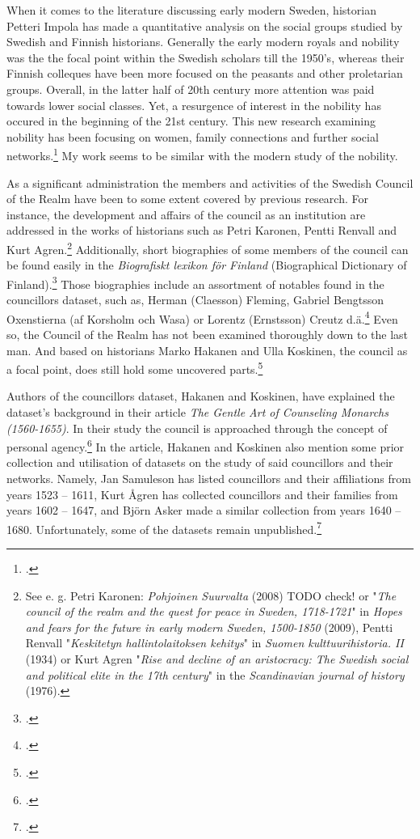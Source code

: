 When it comes to the literature discussing early modern Sweden, historian Petteri Impola has made a quantitative analysis on the social groups studied by Swedish and Finnish historians. Generally the early modern royals and nobility was the the focal point within the Swedish scholars till the 1950's, whereas their Finnish colleques have been more focused on the peasants and other proletarian groups. Overall, in the latter half of 20th century more attention was paid towards lower social classes. Yet, a resurgence of interest in the nobility has occured in the beginning of the 21st century. This new research examining nobility has been focusing on women, family connections and further social networks.\footcite{impola2024} My work seems to be similar with the modern study of the nobility.

As a significant administration the members and activities of the Swedish Council of the Realm have been to some extent covered by previous research. For instance, the development and affairs of the council as an institution are addressed in the works of historians such as Petri Karonen, Pentti Renvall and Kurt Agren.\footnote{See e. g. Petri Karonen: \textit{Pohjoinen Suurvalta} (2008) TODO check! or "\textit{The council of the realm and the quest for peace in Sweden, 1718-1721}" in \textit{Hopes and fears for the future in early modern Sweden, 1500-1850} (2009), Pentti Renvall "\textit{Keskitetyn hallintolaitoksen kehitys}" in \textit{Suomen kulttuurihistoria. II} (1934) or Kurt Agren "\textit{Rise and decline of an aristocracy: The Swedish social and political elite in the 17th century}" in the \textit{Scandinavian journal of history} (1976).} Additionally, short biographies of some members of the council can be found easily in the \textit{Biografiskt lexikon för Finland} (Biographical Dictionary of Finland).\footcite{blf} Those biographies include an assortment of notables found in the councillors dataset, such as, Herman (Claesson) Fleming, Gabriel Bengtsson Oxenstierna (af Korsholm och Wasa) or Lorentz (Ernstsson) Creutz d.ä.\footcite{blf-list} Even so, the Council of the Realm has not been examined thoroughly down to the last man. And based on historians Marko Hakanen and Ulla Koskinen, the council as a focal point, does still hold some uncovered parts.\footcite[p. 47-48.]{HakanenAKoskinen2017} 

Authors of the councillors dataset, Hakanen and Koskinen, have explained the dataset's background in their article \textit{The Gentle Art of Counseling Monarchs (1560-1655)}. In their study the council is approached through the concept of personal agency.\footcite{HakanenAKoskinen2017} In the article, Hakanen and Koskinen also mention some prior collection and utilisation of datasets on the study of said councillors and their networks. Namely, Jan Samuleson has listed councillors and their affiliations from years 1523 – 1611, Kurt Ågren has collected councillors and their families from years 1602 – 1647, and Björn Asker made a similar collection from years 1640 – 1680. Unfortunately, some of the datasets remain unpublished.\footcite[p. 48, 67 (cite 4).]{HakanenAKoskinen2017} 


